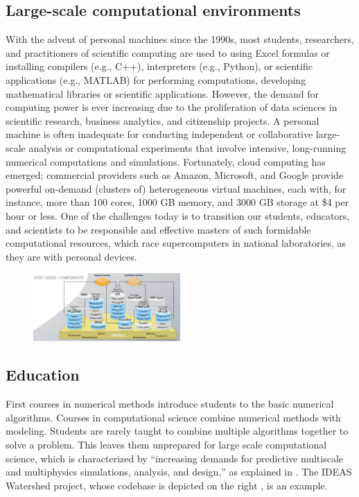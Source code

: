 \documentclass{amsart}
\begin{document}
\subsection{Large-scale computational environments} With the advent of personal machines since the 1990s, most students, researchers, and practitioners of scientific computing are used to using Excel formulas or installing compilers (e.g., C++), interpreters (e.g., Python), or scientific applications (e.g., MATLAB) for performing computations, developing mathematical libraries or scientific applications. However, the demand for computing power is ever increasing due to the proliferation of data sciences in scientific research, business analytics, and citizenship projects. A personal machine is often inadequate for conducting independent or collaborative large-scale analysis or computational experiments that involve intensive, long-running numerical computations and simulations. Fortunately, cloud computing has emerged; commercial providers such as Amazon, Microsoft, and Google provide powerful on-demand (clusters of) heterogeneous virtual machines, each with, for instance, more than 100 cores, 1000 GB memory, and 3000 GB storage at \$4 per hour or less. One of the challenges today is to transition our students, educators, and scientists to be responsible and effective masters of such  formidable computational resources, which race supercomputers in national laboratories, as they are with personal devices.

\begin{figure}
    \includegraphics[width = 0.5\textwidth]{cropped-ideas-watersheds-software-ecosystem-road.jpg}
\end{figure}

\subsection{Education} 
First courses in numerical methods \cite{BurFaiBur16a} introduce students to the basic numerical algorithms.  Courses in computational science \cite{HolEic19a,ShifShif14a} combine numerical methods with modeling.  Students are rarely taught to combine multiple algorithms together to solve a problem.  This leaves them unprepared for  large scale computational science, which is characterized by  ``increasing demands for predictive multiscale and multiphysics simulations, analysis, and design,'' as explained in \cite{IDEASAbout}.  The IDEAS Watershed project, whose codebase is depicted on the right \cite{IDEASWatershedPict}, is an example.
\end{document}
